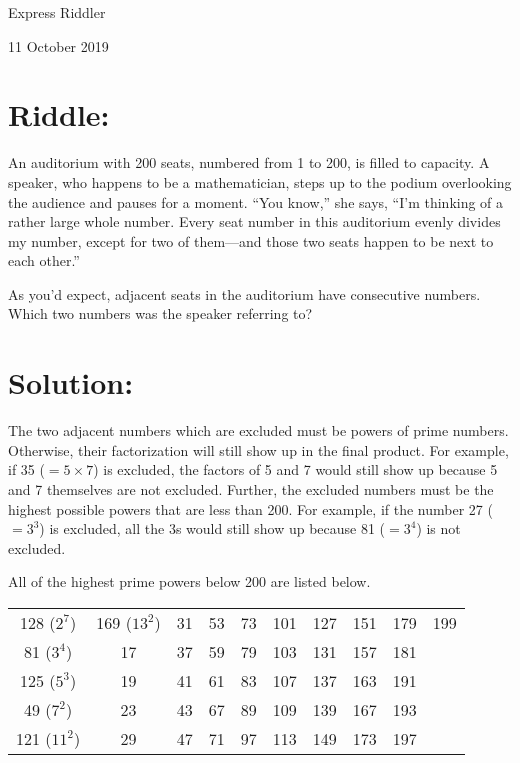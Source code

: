 \documentclass{article}
\begin{document}
\pagestyle{empty} %

\begin{center}
{\LARGE Express Riddler}

\vspace{0.15in}

{\Large 11 October 2019}
\end{center}


\section*{Riddle:}

An auditorium with 200 seats, numbered from 1 to 200, is filled to capacity.
A speaker, who happens to be a mathematician, steps up to the podium overlooking the audience and pauses for a moment.
``You know,'' she says, ``I'm thinking of a rather large whole number.
Every seat number in this auditorium evenly divides my number, except for two of them---and those two seats happen to be next to each other.''

As you'd expect, adjacent seats in the auditorium have consecutive numbers.
Which two numbers was the speaker referring to?


\section*{Solution:}

The two adjacent numbers which are excluded must be powers of prime numbers.
Otherwise, their factorization will still show up in the final product.
For example, if 35 ($=5\times7$) is excluded, the factors of 5 and 7 would still show up because 5 and 7 themselves are not excluded.
Further, the excluded numbers must be the highest possible powers that are less than 200.
For example, if the number 27 ($=3^{3}$) is excluded, all the 3s would still show up because 81 ($=3^{4}$) is not excluded.

All of the highest prime powers below 200 are listed below.

\begin{center}
\begin{tabular*}{5.5in}{@{\extracolsep{\fill}}cccccccccc}
128 ($2^{7}$)  & 169 ($13^{2}$) & 31 & 53 & 73 & 101 & 127 & 151 & 179 & 199 \\
81 ($3^{4}$)   & 17             & 37 & 59 & 79 & 103 & 131 & 157 & 181 & \\
125 ($5^{3}$)  & 19             & 41 & 61 & 83 & 107 & 137 & 163 & 191 & \\
49 ($7^{2}$)   & 23             & 43 & 67 & 89 & 109 & 139 & 167 & 193 & \\
121 ($11^{2}$) & 29             & 47 & 71 & 97 & 113 & 149 & 173 & 197 & \\
\end{tabular*}
\end{center}
\end{document}

